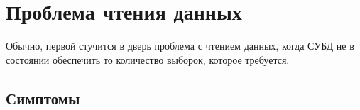\section{Проблема чтения данных}

Обычно, первой стучится в дверь проблема с чтением данных, когда СУБД не в состоянии обеспечить то количество выборок, которое требуется.

\subsection{Симптомы}
